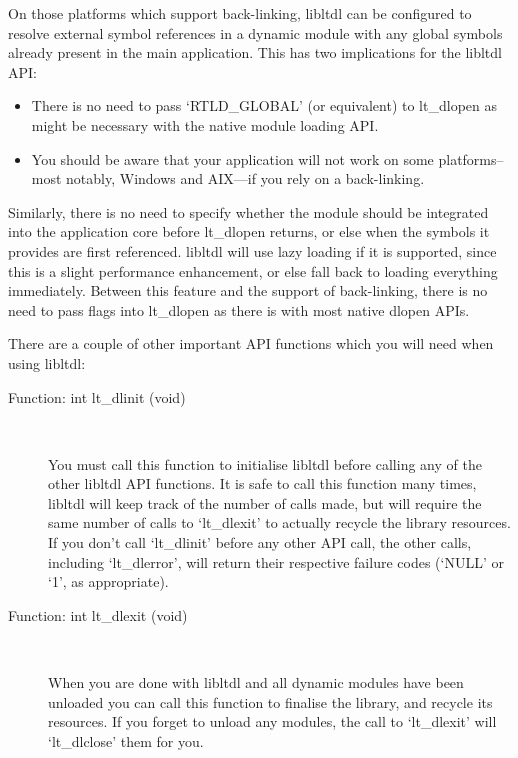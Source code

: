On those platforms which support back-linking, libltdl can be configured to resolve external symbol references in a dynamic module with any global symbols already present in the main application. This has two implications for the libltdl API:

\begin{itemize}
\item There is no need to pass `RTLD\_{}GLOBAL' (or equivalent) to lt\_{}dlopen as might be necessary with the native module loading API.

\item You should be aware that your application will not work on some platforms--most notably, Windows and AIX---if you rely on a back-linking. 
\end{itemize}

Similarly, there is no need to specify whether the module should be integrated into the application core before lt\_{}dlopen returns, or else when the symbols it provides are first referenced. libltdl will use lazy loading if it is supported, since this is a slight performance enhancement, or else fall back to loading everything immediately. Between this feature and the support of back-linking, there is no need to pass flags into lt\_{}dlopen as there is with most native dlopen APIs.

There are a couple of other important API functions which you will need when using libltdl: 

\begin{description}
\item[Function: int lt\_{}dlinit (void)]
\

    You must call this function to initialise libltdl before calling any of the other libltdl API functions. It is safe to call this function many times, libltdl will keep track of the number of calls made, but will require the same number of calls to `lt\_{}dlexit' to actually recycle the library resources. If you don't call `lt\_{}dlinit' before any other API call, the other calls, including `lt\_{}dlerror', will return their respective failure codes (`NULL' or `1', as appropriate). 

\item[Function: int lt\_{}dlexit (void)]
\

    When you are done with libltdl and all dynamic modules have been unloaded you can call this function to finalise the library, and recycle its resources. If you forget to unload any modules, the call to `lt\_{}dlexit' will `lt\_{}dlclose' them for you. 
\end{description}

